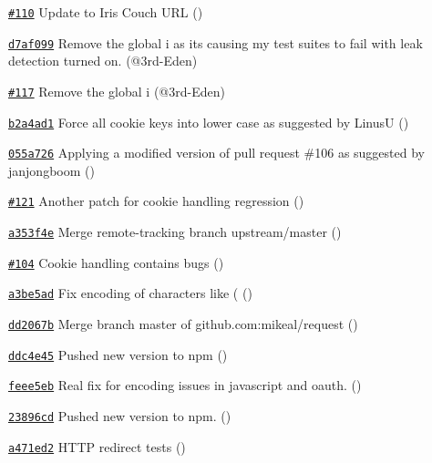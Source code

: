 \begin{DoxyItemize}
\item \href{https://github.com/mikeal/request/pull/110}{\tt \#110} Update to Iris Couch U\+R\+L ()
\item \href{https://github.com/mikeal/request/commit/d7af0994b382466367f2cafc5376150e661eeb9d}{\tt d7af099} Remove the global {\ttfamily i} as it\textquotesingle{}s causing my test suites to fail with leak detection turned on. (@3rd-\/\+Eden)
\item \href{https://github.com/mikeal/request/pull/117}{\tt \#117} Remove the global {\ttfamily i} (@3rd-\/\+Eden)
\item \href{https://github.com/mikeal/request/commit/b2a4ad1e7d7553230e932ea093d7f77f38147ef9}{\tt b2a4ad1} Force all cookie keys into lower case as suggested by Linus\+U ()
\item \href{https://github.com/mikeal/request/commit/055a7268b40425643d23bd6a4f09c7268dbab680}{\tt 055a726} Applying a modified version of pull request \#106 as suggested by janjongboom ()
\item \href{https://github.com/mikeal/request/pull/121}{\tt \#121} Another patch for cookie handling regression ()
\item \href{https://github.com/mikeal/request/commit/a353f4eeb312ea378d34b624f5c4df33eefa152c}{\tt a353f4e} Merge remote-\/tracking branch \textquotesingle{}upstream/master\textquotesingle{} ()
\item \href{https://github.com/mikeal/request/pull/104}{\tt \#104} Cookie handling contains bugs ()
\item \href{https://github.com/mikeal/request/commit/a3be5ad5ea112422ed00da632530b93bcf54727c}{\tt a3be5ad} Fix encoding of characters like ( ()
\item \href{https://github.com/mikeal/request/commit/dd2067bbbf77d1132c9ed480848645136b8a5521}{\tt dd2067b} Merge branch \textquotesingle{}master\textquotesingle{} of github.\+com\+:mikeal/request ()
\item \href{https://github.com/mikeal/request/commit/ddc4e453c3b9a0e11da4df156c5e15206abfc1ef}{\tt ddc4e45} Pushed new version to npm ()
\item \href{https://github.com/mikeal/request/commit/feee5ebd2ca8c09db25b5cb13cd951f7c4322a49}{\tt feee5eb} Real fix for encoding issues in javascript and oauth. ()
\item \href{https://github.com/mikeal/request/commit/23896cdc66d75ec176876167ff21da72b7ff181b}{\tt 23896cd} Pushed new version to npm. ()
\item \href{https://github.com/mikeal/request/commit/a471ed2ca8acdca1010a0fc20434c5c9956b0d0c}{\tt a471ed2} H\+T\+T\+P redirect tests ()

\end{DoxyItemize}
